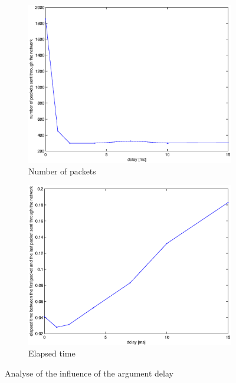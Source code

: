 \documentclass[11pt,a4paper]{article}
\begin{document}
\begin{figure}[!h]
        \centering
        \begin{subfigure}[b]{0.49\textwidth}
		\centering \includegraphics[width=\textwidth]{images/npackets.eps}
		\caption{Number of packets}
		\label{FluxSquareSum}
	\end{subfigure}
        \begin{subfigure}[b]{0.49\textwidth}
        		\centering\includegraphics[width=\textwidth]{images/time.eps}
		\caption{Elapsed time}
		\label{analyse}
	\end{subfigure}
	\caption{Analyse of the influence of the argument delay}
	\label{deltafluxvar}
\end{figure}
\end{document}
